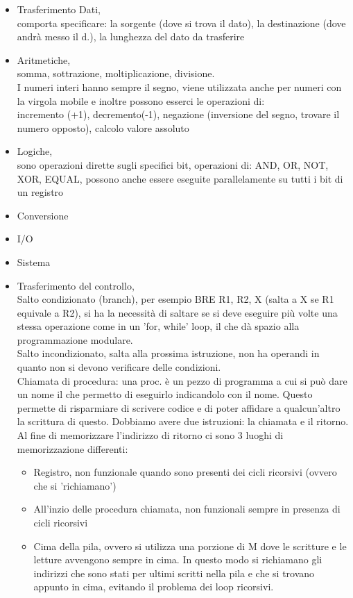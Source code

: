 \documentclass[12pt, a4paper]{report}
\begin{document}
\begin{itemize}
	\item Trasferimento Dati,\\
		comporta specificare: la sorgente (dove si trova il dato), la destinazione (dove andrà messo il d.),
		la lunghezza del dato da trasferire
	\item Aritmetiche,\\
		somma, sottrazione, moltiplicazione, divisione.\\
		I numeri interi hanno sempre il segno, viene utilizzata anche per numeri con la virgola mobile e inoltre
		possono esserci le operazioni di:\\
		incremento (+1), decremento(-1), negazione (inversione del segno, trovare il numero opposto), calcolo valore 
		assoluto
	\item Logiche,\\
		sono operazioni dirette sugli specifici bit, operazioni di: AND, OR, NOT, XOR, EQUAL,
		possono anche essere eseguite parallelamente su tutti i bit di un registro
	\item Conversione
	\item I/O
	\item Sistema
	\item Trasferimento del controllo,\\
		Salto condizionato (branch), per esempio BRE R1, R2, X (salta a X se R1 equivale a R2),
		si ha la necessità di saltare se si deve eseguire più volte una stessa operazione come in 
		un 'for, while' loop, il che dà spazio alla programmazione modulare.\\
		Salto incondizionato, salta alla prossima istruzione, non ha operandi in quanto non si devono verificare 
		delle condizioni.\\
		Chiamata di procedura: una proc. è un pezzo di programma a cui si può dare un nome il che permetto di eseguirlo
		indicandolo con il nome. Questo permette di risparmiare di scrivere codice e di poter affidare a qualcun'altro 
		la scrittura di questo. Dobbiamo avere due istruzioni: la chiamata e il ritorno.\\
		Al fine di memorizzare l'indirizzo di ritorno ci sono 3 luoghi di memorizzazione differenti:

		\begin{itemize}
			\item Registro, non funzionale quando sono presenti dei cicli ricorsivi (ovvero che si 'richiamano')
			\item All'inzio delle procedura chiamata, non funzionali sempre in presenza di cicli ricorsivi
			\item Cima della pila, ovvero si utilizza una porzione di M dove le scritture e le letture
				avvengono sempre in cima. In questo modo si richiamano gli indirizzi che sono stati per ultimi scritti
				nella pila e che si trovano appunto in cima, evitando il problema dei loop ricorsivi.
		\end{itemize}
	\end{itemize}
\end{document}
